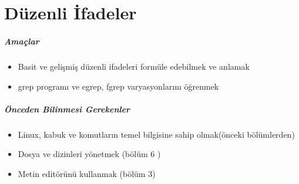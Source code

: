 \documentclass[10pt,a5paper]{book}
\begin{document}
\chapter{Düzenli İfadeler}

\paragraph{Amaçlar}
\begin{itemize}
 \item Basit ve gelişmiş düzenli ifadeleri formüle edebilmek ve anlamak
 \item grep programı ve egrep, fgrep varyasyonlarını öğrenmek
 \end{itemize}
 
\paragraph{Önceden Bilinmesi Gerekenler}
\begin{itemize}
 \item Linux, kabuk ve komutların temel bilgisine sahip olmak(önceki bölümlerden)
 \item Dosya ve dizinleri yönetmek (bölüm 6 )
 \item Metin editörünü kullanmak (bölüm 3)
 \end{itemize}
\end{document}
